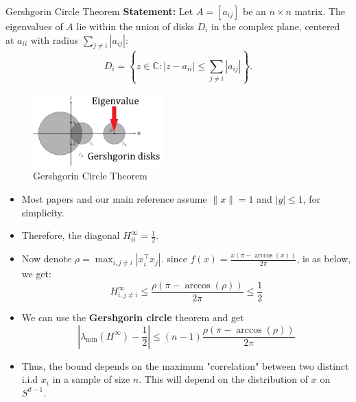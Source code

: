 \documentclass[serif, aspectratio=169]{beamer}
\begin{document}
\begin{frame}{Gershgorin Circle Theorem}
	\textbf{Statement:} Let \( A = [a_{ij}] \) be an \( n \times n \) matrix. The eigenvalues of \( A \) lie within the union of disks \( D_i \) in the complex plane, centered at \( a_{ii} \) with radius \( \sum_{j \neq i} |a_{ij}| \):
	\[
	D_i = \left\{ z \in \mathbb{C} : |z - a_{ii}| \leq \sum_{j \neq i} |a_{ij}| \right\}.
	\]


    \begin{figure}
		\centering
		\includegraphics[width=0.45\textwidth]{pic/gresh.jpg}
		\caption{Gershgorin Circle Theorem}
	\end{figure}
\end{frame}
\begin{frame}
\begin{itemize}
	  \item Most papers and our main reference assume \(\|x\|=1\) and \(|y|\leq 1\), for simplicity.
	
	\item Therefore, the diagonal \(H^\infty_{ii} = \frac{1}{2}\).
	\item Now denote \(\rho = \max_{i,j\neq i} |x_i^\top x_j| \). since \(f(x)=\frac{x(\pi-\arccos(x))}{2\pi}\), is as below, we get:
	\[
	H^\infty_{i,j\neq i} \leq \frac{\rho(\pi-\arccos(\rho))}{2\pi} \leq \frac{1}{2}
	\]
	\item We can use the \textbf{Gershgorin circle} theorem and get
	\[
	| \lambda_{\min}(H^\infty) - \frac{1}{2} | \leq (n-1)\frac{\rho(\pi-\arccos(\rho))}{2\pi}
	\]
	\item Thus, the bound depends on the maximum "correlation" between two distinct i.i.d \(x_i\) in a sample of size \(n\). This will depend on the distribution of \(x\) on \(S^{d-1}\).
\end{itemize}
\end{frame}
\end{document}
